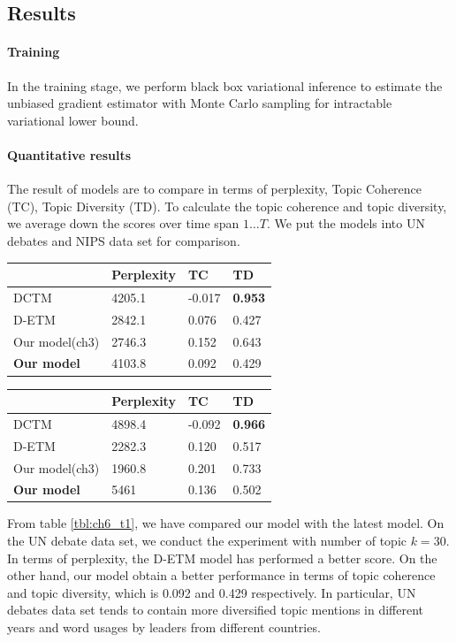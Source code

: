 \subsection{Results}
\paragraph{Training}
In the training stage, we perform black box variational inference to estimate the unbiased gradient estimator with Monte Carlo sampling for intractable variational lower bound.
\paragraph{Quantitative results}
The result of models are to compare in terms of perplexity, Topic Coherence (TC), Topic Diversity (TD). To calculate the topic coherence and topic diversity, we average down the scores over time span $ 1\dots T $. We put the models into UN debates and NIPS data set for comparison.
\begin{table}[h]
\centering
\begin{tabular}{llll}
\hline
     & Perplexity  &TC&TD\\ \hline
DCTM	     	&  4205.1 & -0.017 & \textbf{0.953}\\
D-ETM	     	&  2842.1 & 0.076 & 0.427 \\
Our model(ch3) & 2746.3 & 0.152 & 0.643 \\
\textbf{Our model}  & 4103.8 & 0.092 & 0.429 \\ \hline
\end{tabular}
\end{table}
\begin{table}[h]
\centering
\begin{tabular}{llll}
\hline
     & Perplexity & TC & TD \\\hline
DCTM	     	& 4898.4 & -0.092 & \textbf{0.966} \\
D-ETM	     	& 2282.3 & 0.120 & 0.517 \\
Our model(ch3) & 1960.8 & 0.201 & 0.733 \\
\textbf{Our model}  & 5461 & 0.136 & 0.502 \\\hline
\end{tabular}
\end{table}
From table \ref{tbl:ch6_t1}, we have compared our model with the latest model. On the UN debate data set, we conduct the experiment with number of topic $ k=30 $. In terms of perplexity, the D-ETM model has performed a better score. On the other hand, our model obtain a better performance in terms of topic coherence and topic diversity, which is 0.092 and 0.429 respectively. In particular, UN debates data set tends to contain more diversified topic mentions in different years and word usages by leaders from different countries. 
